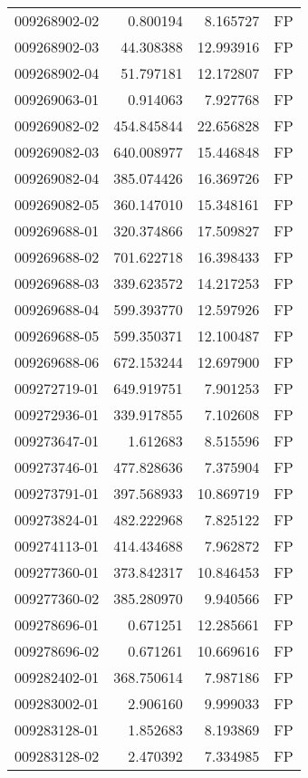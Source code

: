 \begin{tabular}{lrrl}
009268902-02 &    0.800194 &     8.165727 &   FP \\
009268902-03 &   44.308388 &    12.993916 &   FP \\
009268902-04 &   51.797181 &    12.172807 &   FP \\
009269063-01 &    0.914063 &     7.927768 &   FP \\
009269082-02 &  454.845844 &    22.656828 &   FP \\
009269082-03 &  640.008977 &    15.446848 &   FP \\
009269082-04 &  385.074426 &    16.369726 &   FP \\
009269082-05 &  360.147010 &    15.348161 &   FP \\
009269688-01 &  320.374866 &    17.509827 &   FP \\
009269688-02 &  701.622718 &    16.398433 &   FP \\
009269688-03 &  339.623572 &    14.217253 &   FP \\
009269688-04 &  599.393770 &    12.597926 &   FP \\
009269688-05 &  599.350371 &    12.100487 &   FP \\
009269688-06 &  672.153244 &    12.697900 &   FP \\
009272719-01 &  649.919751 &     7.901253 &   FP \\
009272936-01 &  339.917855 &     7.102608 &   FP \\
009273647-01 &    1.612683 &     8.515596 &   FP \\
009273746-01 &  477.828636 &     7.375904 &   FP \\
009273791-01 &  397.568933 &    10.869719 &   FP \\
009273824-01 &  482.222968 &     7.825122 &   FP \\
009274113-01 &  414.434688 &     7.962872 &   FP \\
009277360-01 &  373.842317 &    10.846453 &   FP \\
009277360-02 &  385.280970 &     9.940566 &   FP \\
009278696-01 &    0.671251 &    12.285661 &   FP \\
009278696-02 &    0.671261 &    10.669616 &   FP \\
009282402-01 &  368.750614 &     7.987186 &   FP \\
009283002-01 &    2.906160 &     9.999033 &   FP \\
009283128-01 &    1.852683 &     8.193869 &   FP \\
009283128-02 &    2.470392 &     7.334985 &   FP \\

\end{tabular}
